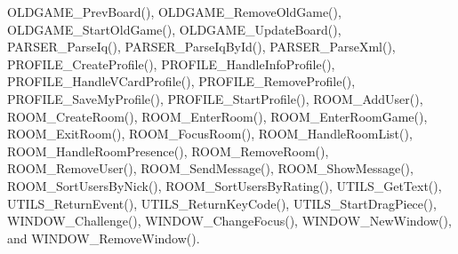 OLDGAME\_\-PrevBoard(), OLDGAME\_\-RemoveOldGame(), OLDGAME\_\-StartOldGame(), OLDGAME\_\-UpdateBoard(), PARSER\_\-ParseIq(), PARSER\_\-ParseIqById(), PARSER\_\-ParseXml(), PROFILE\_\-CreateProfile(), PROFILE\_\-HandleInfoProfile(), PROFILE\_\-HandleVCardProfile(), PROFILE\_\-RemoveProfile(), PROFILE\_\-SaveMyProfile(), PROFILE\_\-StartProfile(), ROOM\_\-AddUser(), ROOM\_\-CreateRoom(), ROOM\_\-EnterRoom(), ROOM\_\-EnterRoomGame(), ROOM\_\-ExitRoom(), ROOM\_\-FocusRoom(), ROOM\_\-HandleRoomList(), ROOM\_\-HandleRoomPresence(), ROOM\_\-RemoveRoom(), ROOM\_\-RemoveUser(), ROOM\_\-SendMessage(), ROOM\_\-ShowMessage(), ROOM\_\-SortUsersByNick(), ROOM\_\-SortUsersByRating(), UTILS\_\-GetText(), UTILS\_\-ReturnEvent(), UTILS\_\-ReturnKeyCode(), UTILS\_\-StartDragPiece(), WINDOW\_\-Challenge(), WINDOW\_\-ChangeFocus(), WINDOW\_\-NewWindow(), and WINDOW\_\-RemoveWindow().